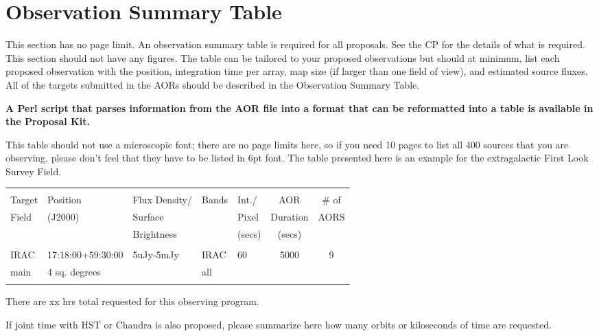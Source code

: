 \documentclass[letterpaper,12pt]{article}
\begin{document}

\section{Observation Summary Table}

This section has no page limit. An observation summary table is required for all 
proposals.  See the CP for the details of what is required. This section should not
have any figures. The table can be tailored to your proposed observations
but should at minimum, list each proposed observation with the position,
integration time per array, map size (if larger than one field of view), 
and estimated source fluxes. All of the targets submitted in the AORs 
should be described in the Observation Summary Table.\newline

{\bf A Perl script that parses information from the AOR file into 
a format that can be reformatted into a table is available in the Proposal Kit.}\newline

This table should not use a microscopic font; there are no page
limits here, so if you need 10 pages to list all 400 sources that
you are observing, please don't feel that they have to be listed
in 6pt font. The table presented here is an example for the extragalactic 
First Look Survey Field.\newline

\bigskip
\begin{tabular}{lllllcc}
\hline \\ 
Target & Position & Flux Density/       & Bands  & Int./ & AOR & \# of \\
Field & (J2000)   & Surface &  & Pixel & Duration & AORS \\
& & Brightness & & (secs) & (secs) & \\
\hline \\ 
IRAC & 17:18:00+59:30:00 & 5uJy-5mJy & IRAC & 60 & 5000 & 9 \\
main & 4 sq. degrees & & all& & &  \\
\hline \\
\end{tabular}

There are xx hrs total requested for this observing program.\newline

If joint time with HST or Chandra is also proposed, please summarize 
here how many orbits or kiloseconds of time are requested.
\end{document}
